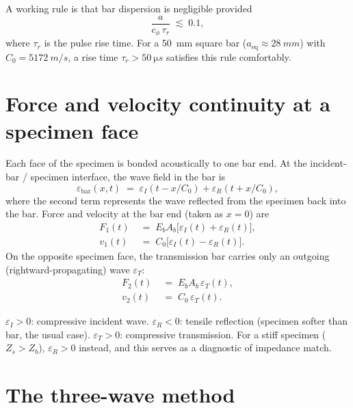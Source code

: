\documentclass[11pt,a4paper,openany]{book}
\providecommand{\SI}[2]{\qty{#1}{#2}}
\theoremstyle{handbook}
\newcommand{\eps}{\varepsilon}
\newcommand{\Cz}{C_0}
\newcommand{\Ab}{A_b}
\begin{document}
A working rule is that bar dispersion is negligible provided
\begin{equation}
  \frac{a}{c_\phi\,\tau_r} \;\lesssim\; 0.1,
  \label{eq:dispersion-rule}
\end{equation}
where $\tau_r$ is the pulse rise time. For a \SI{50}{mm} square bar
($a_{\text{eq}} \approx \SI{28}{mm}$) with $\Cz = \SI{5172}{m/s}$, a rise
time $\tau_r > \SI{50}{\micro s}$ satisfies this rule comfortably.

\section{Force and velocity continuity at a specimen face}

Each face of the specimen is bonded acoustically to one bar end. At the
incident-bar / specimen interface, the wave
field in the bar is
\begin{equation}
  \eps_{\text{bar}}(x,t) \;=\; \eps_I(t - x/\Cz) + \eps_R(t + x/\Cz),
\end{equation}
where the second term represents the wave reflected from the specimen back
into the bar. Force and velocity at the bar end (taken as $x=0$) are
\begin{align}
  F_1(t) &\;=\; E_b\Ab\bigl[\eps_I(t) + \eps_R(t)\bigr],
  \label{eq:F1} \\
  v_1(t) &\;=\; \Cz\bigl[\eps_I(t) - \eps_R(t)\bigr].
  \label{eq:v1}
\end{align}
On the opposite specimen face, the transmission bar carries only an outgoing
(rightward-propagating) wave $\eps_T$:
\begin{align}
  F_2(t) &\;=\; E_b\Ab\,\eps_T(t),
  \label{eq:F2} \\
  v_2(t) &\;=\; \Cz\,\eps_T(t).
  \label{eq:v2}
\end{align}

\begin{conceptbox}
$\eps_I>0$: compressive incident wave.
$\eps_R<0$: tensile reflection (specimen softer than bar, the usual case).
$\eps_T>0$: compressive transmission.
For a stiff specimen ($Z_s>Z_b$), $\eps_R>0$ instead, and this serves as a
diagnostic of impedance match.
\end{conceptbox}

\section{The three-wave method}\label{sec:three-wave}
\end{document}
